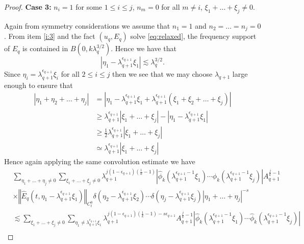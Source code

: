 \documentclass[12pt,reqno,letterpaper]{amsart}
\numberwithin{equation}{section}
\newcommand{\1}{{\bf 1}}
\newcommand{\2}{{\bf 2}}
\theoremstyle{remark}
\theoremstyle{remark}
\begin{document}
\begin{proof}
    \textbf{Case 3:} $n_i = 1$ for some $1 \leq i \leq j$, $n_m=0$ for all $m \not=i$, $\xi_1 + \ldots + \xi_j \not= 0$.

    Again from symmetry considerations we assume that $n_1 = 1$ and $n_2 = \ldots = n_j = 0$. From item \ref{i:3} and the fact $(u_q,E_q)$ solve \eqref{eq:relaxed}, the frequency support of $E_q$ is contained in $B(0,k\lambda_q^{3/2})$. Hence we have that
    $$
    |\eta_1 - \lambda_{q+1}^{\epsilon_{q+1}} \xi_1| \lesssim \lambda_q^{3/2}.
    $$
    Since $\eta_i = \lambda_{q+1}^{\epsilon_{q+1}} \xi_i$ for all $2 \leq i \leq j$ then we see that we may choose $\lambda_{q+1}$ large enough to ensure that
    \begin{equation}\label{eq:AF-case3-gap}
        \begin{split}
            |\eta_1 + \eta_2 + \ldots + \eta_j| &= \left|\eta_1 - \lambda_{q+1}^{\epsilon_{q+1}} \xi_1 + \lambda_{q+1}^{\epsilon_{q+1}}\left(\xi_1 + \xi_2 + \ldots + \xi_j\right)\right|\\
            &\geq \lambda_{q+1}^{\epsilon_{q+1}} \left|\xi_1 + \ldots + \xi_j\right| - |\eta_1 - \lambda_{q+1}^{\epsilon_{q+1}} \xi_1|\\
            &\geq \frac{1}{2}\lambda_{q+1}^{\epsilon_{q+1}} \left|\xi_1 + \ldots + \xi_j\right|\\
            &\simeq \lambda_{q+1}^{\epsilon_{q+1}} \left|\xi_1 + \ldots + \xi_j\right|
        \end{split}
    \end{equation}
    Hence again applying the same convolution estimate we have
    \begin{equation}\label{eq:n=1_case_2}
        \begin{split}
            &\sum_{\eta_1 + \ldots + \eta_j \not=0} \sum_{\xi_1 + \ldots + \xi_j \not= 0} \lambda_{q+1}^{j(1-\epsilon_{q+1})\left(\frac{1}{k} - 1\right)} \left|\hat{\phi}_k\left(\lambda_{q+1}^{\epsilon_{q+1}-1}\xi_1\right) \cdots \hat{\phi}_k\left(\lambda_{q+1}^{\epsilon_{q+1}-1}\xi_j\right)\right| A_{q+1}^{\frac{j}{k}-1}\\
           &\times \left\Vert \hat{E}_q(t,\eta_1 - \lambda_{q+1}^{\epsilon_{q+1}} \xi_1)\right\Vert_{C_t^0}\delta(\eta_2 - \lambda_{q+1}^{\epsilon_{q+1}} \xi_2) \cdots \delta(\eta_j - \lambda_{q+1}^{\epsilon_{q+1}} \xi_j) |\eta_1 + \ldots + \eta_j|^{-s}\\
           &\lesssim  \sum_{\xi_1 + \ldots + \xi_j \not=0} \sum_{\eta_1 \not= \lambda_{q+1}^{\epsilon_{q+1}} \xi_1} \lambda_{q+1}^{j(1-\epsilon_{q+1})\left(\frac{1}{k}-1\right)-s\epsilon_{q+1}} A_{q+1}^{\frac{j}{k}-1} \left|\hat{\phi}_k\left(\lambda_{q+1}^{\epsilon_{q+1}-1}\xi_1\right) \cdots \hat{\phi}_k\left(\lambda_{q+1}^{\epsilon_{q+1}-1}\xi_j\right)\right|\\

\end{split}
\end{equation}
\end{proof}
\end{document}

